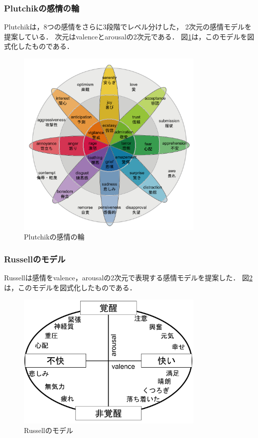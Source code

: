 		\subsubsection{Plutchikの感情の輪}
			Plutchik\cite{plutchik}は，8つの感情をさらに3段階でレベル分けした，
			2次元の感情モデルを提案している．
			次元はvalenceとarousalの2次元である．
			図\ref{fig:plutchik}は，このモデルを図式化したものである．
			\begin{figure}[H]
				\centering
				\includegraphics[width=90mm]{./figure/plutchik.png}
				\caption{Plutchikの感情の輪}
				\label{fig:plutchik}
			\end{figure}
			

		\subsubsection{Russellのモデル}
			Russell\cite{russell_2D}は感情をvalence，arousalの2次元で表現する感情モデルを提案した．
			図\ref{fig:russel_2D}は，このモデルを図式化したものである．
			\begin{figure}[H]
				\centering
				\includegraphics[width=90mm]{./figure/russell.png}
				\caption{Russellのモデル}
				\label{fig:russel_2D}
			\end{figure}

